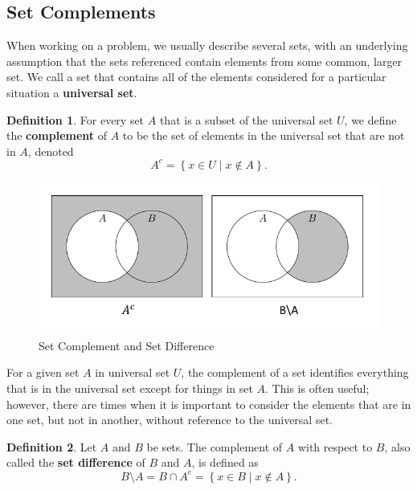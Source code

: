 \documentclass[
]{book}
\theoremstyle{definition}
\newtheorem{definition}{Definition}[chapter]
\theoremstyle{definition}
\theoremstyle{definition}
\theoremstyle{definition}
\theoremstyle{remark}
\begin{document}
\hypertarget{set-complements}{%
\subsection{Set Complements}\label{set-complements}}

When working on a problem, we usually describe several sets, with an underlying assumption that the sets referenced contain elements from some common, larger set. We call a set that contains all of the elements considered for a particular situation a \textbf{universal set}.

\begin{definition}
\protect\hypertarget{def:set-complement}{}\label{def:set-complement}For every set \(A\) that is a subset of the universal set \(U\), we define the \textbf{complement} of \(A\) to be the set of elements in the universal set that are not in \(A\), denoted
\[A^c=\left\{ x\in U \middle \vert x \notin A\right\}.\]
\end{definition}

\begin{figure}

{\centering \includegraphics[width=0.8\linewidth]{tikz/set-difference} 

}

\caption{Set Complement and Set Difference}\label{fig:set-difference}
\end{figure}

For a given set \(A\) in universal set \(U\), the complement of a set identifies everything that is in the universal set except for things in set \(A\). This is often useful; however, there are times when it is important to consider the elements that are in one set, but not in another, without reference to the universal set.

\begin{definition}
\protect\hypertarget{def:set-difference}{}\label{def:set-difference}Let \(A\) and \(B\) be sets. The complement of \(A\) with respect to \(B\), also called the \textbf{set difference} of \(B\) and \(A\), is defined as \[B\setminus A = B \cap A^c = \left\{x\in B \middle \vert x \notin A\right\}.\]
\end{definition}
\end{document}
